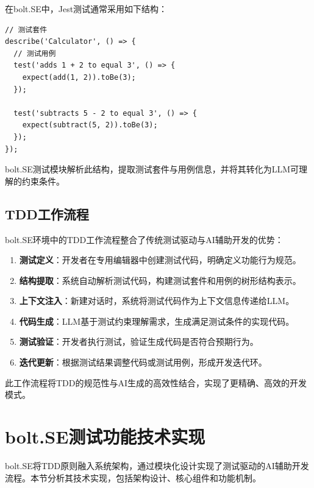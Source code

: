 在bolt.SE中，Jest测试通常采用如下结构：

\begin{verbatim}
// 测试套件
describe('Calculator', () => {
  // 测试用例
  test('adds 1 + 2 to equal 3', () => {
    expect(add(1, 2)).toBe(3);
  });
  
  test('subtracts 5 - 2 to equal 3', () => {
    expect(subtract(5, 2)).toBe(3);
  });
});
\end{verbatim}

bolt.SE测试模块解析此结构，提取测试套件与用例信息，并将其转化为LLM可理解的约束条件。

\subsection{TDD工作流程}

bolt.SE环境中的TDD工作流程整合了传统测试驱动与AI辅助开发的优势：

\begin{enumerate}
  \item \textbf{测试定义}：开发者在专用编辑器中创建测试代码，明确定义功能行为规范。
  
  \item \textbf{结构提取}：系统自动解析测试代码，构建测试套件和用例的树形结构表示。
  
  \item \textbf{上下文注入}：新建对话时，系统将测试代码作为上下文信息传递给LLM。
  
  \item \textbf{代码生成}：LLM基于测试约束理解需求，生成满足测试条件的实现代码。
  
  \item \textbf{测试验证}：开发者执行测试，验证生成代码是否符合预期行为。
  
  \item \textbf{迭代更新}：根据测试结果调整代码或测试用例，形成开发迭代环。
\end{enumerate}

此工作流程将TDD的规范性与AI生成的高效性结合，实现了更精确、高效的开发模式。

\section{bolt.SE测试功能技术实现}

bolt.SE将TDD原则融入系统架构，通过模块化设计实现了测试驱动的AI辅助开发流程。本节分析其技术实现，包括架构设计、核心组件和功能机制。

